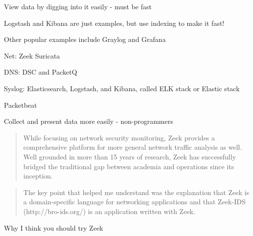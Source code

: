 \documentclass[20pt,landscape,a4paper,footrule]{foils}
\begin{document}


\begin{list1}
\item View data by digging into it easily - must be fast
\item Logstash and Kibana are just examples, but use indexing to make it fast!
\item Other popular examples include Graylog and Grafana
\end{list1}


\begin{list1}
\item Net: Zeek  Suricata 
\item DNS: DSC and PacketQ 
\item Syslog: Elasticsearch, Logstash, and Kibana, called ELK stack or Elastic stack
\item Packetbeat 
\end{list1}
\centerline{Collect and present data more easily - non-programmers}




\begin{quote}
While focusing on network security monitoring, Zeek provides a comprehensive platform for more general network traffic analysis as well. Well grounded in more than 15 years of research, Zeek has successfully bridged the traditional gap between academia and operations since its inception.
\end{quote}



\begin{quote}
	The key point that helped me understand was the explanation that Zeek is a
               domain-specific language for networking applications and that Zeek-IDS
               (http://bro-ids.org/) is an application written with Zeek.
\end{quote}

Why I think you should try Zeek\\
\\
\end{document}
